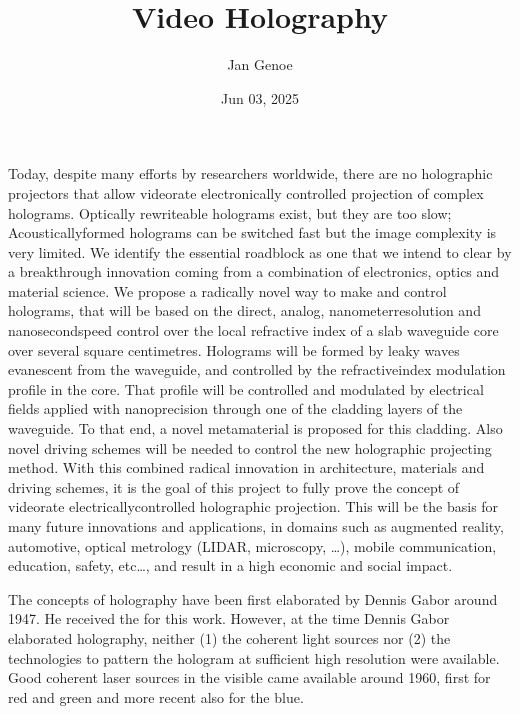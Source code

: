 \documentclass[a4paper,10pt,english,openany,oneside]{jupyterBook}
\title{Video Holography}
\date{Jun 03, 2025}
\author{Jan Genoe}
\begin{document}
\pagestyle{empty}
\sphinxmaketitle
\pagestyle{plain}
\sphinxtableofcontents
\pagestyle{normal}
\label{\detokenize{intro2::doc}}


\begin{DUlineblock}{0em}
\item[] 
\end{DUlineblock}

\sphinxAtStartPar
Today, despite many efforts by researchers world\sphinxhyphen{}wide, there are no holographic projectors that allow video\sphinxhyphen{}rate electronically controlled projection of complex holograms. Optically re\sphinxhyphen{}write\sphinxhyphen{}able holograms exist, but they are too slow; Acoustically\sphinxhyphen{}formed holograms can be switched fast but the image complexity is very limited. We identify the essential roadblock as one that we intend to clear by a breakthrough innovation coming from a combination of electronics, optics and material science.
We propose a radically novel way to make and control holograms, that will be based on the direct, analog, nanometer\sphinxhyphen{}resolution and nanosecond\sphinxhyphen{}speed control over the local refractive index of a slab waveguide core over several square centimetres. Holograms will be formed by leaky waves evanescent from the waveguide, and controlled by the refractive\sphinxhyphen{}index modulation profile in the core. That profile will be controlled and modulated by electrical fields applied with nano\sphinxhyphen{}precision through one of the cladding layers of the waveguide. To that end, a novel metamaterial is proposed for this cladding. Also novel driving schemes will be needed to control the new holographic projecting method.
With this combined radical innovation in architecture, materials and driving schemes, it is the goal of this project to fully prove the concept of video\sphinxhyphen{}rate electrically\sphinxhyphen{}controlled holographic projection. This will be the basis for many future innovations and applications, in domains such as augmented reality, automotive, optical metrology (LIDAR, microscopy, …), mobile communication, education, safety, etc…, and result in a high economic and social impact.

\begin{DUlineblock}{0em}
\item[] 
\end{DUlineblock}

\sphinxAtStartPar
The concepts of holography have been first elaborated by Dennis Gabor around 1947. He received the  for this work. However, at the time Dennis Gabor elaborated holography, neither (1) the coherent light sources nor (2) the technologies to pattern the hologram at sufficient high resolution were available. Good coherent laser sources in the visible came available around 1960, first for red and green and more recent also for the blue.
\end{document}
